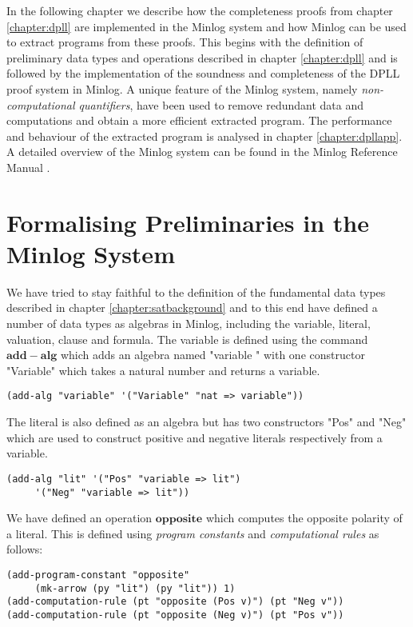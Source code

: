  \label{chapter:dpllminlog}
In the following chapter we describe how the completeness proofs from chapter \ref{chapter:dpll} are implemented in the Minlog system and how Minlog can be used to extract programs from these proofs.  This begins with the definition of preliminary data types and operations described in chapter \ref{chapter:dpll} and is followed by the implementation of the soundness and completeness of the DPLL proof system in Minlog. A unique feature of the Minlog system, namely \emph{non-computational quantifiers}, have been used to remove redundant data and computations and obtain a more efficient extracted program. The performance and behaviour of the extracted program is analysed in chapter \ref{chapter:dpllapp}. A detailed overview of the Minlog system can be found in the Minlog Reference Manual \cite{MinlogRef}.

\section{Formalising Preliminaries in the Minlog System}
We have tried to stay faithful to the definition of the fundamental data types described in chapter \ref{chapter:satbackground} and to this end have defined a number of data types as algebras in Minlog, including the variable, literal, valuation, clause and formula. The variable is defined using the command $\mathbf{add-alg}$ which adds an algebra named "variable " with one constructor "Variable" which takes a natural number and returns a variable.
\begin{lstlisting}[caption = "Definition of a variable in Minlog"]
(add-alg "variable" '("Variable" "nat => variable"))
\end{lstlisting}
The literal is also defined as an algebra but has two constructors "Pos" and "Neg" which are used to construct positive and negative literals respectively from a variable.
\begin{lstlisting}[caption = "Definition of a literal in Minlog"]
(add-alg "lit" '("Pos" "variable => lit")
     '("Neg" "variable => lit"))
\end{lstlisting}

We have defined an operation $\mathbf{opposite}$ which computes the opposite polarity of a literal. This is defined using \emph{program constants} and \emph{computational rules} as follows:

\begin{lstlisting}[caption = "Definition of the opposite operation in the Minlog System"]
(add-program-constant "opposite" 
     (mk-arrow (py "lit") (py "lit")) 1)
(add-computation-rule (pt "opposite (Pos v)") (pt "Neg v"))
(add-computation-rule (pt "opposite (Neg v)") (pt "Pos v"))
\end{lstlisting}



